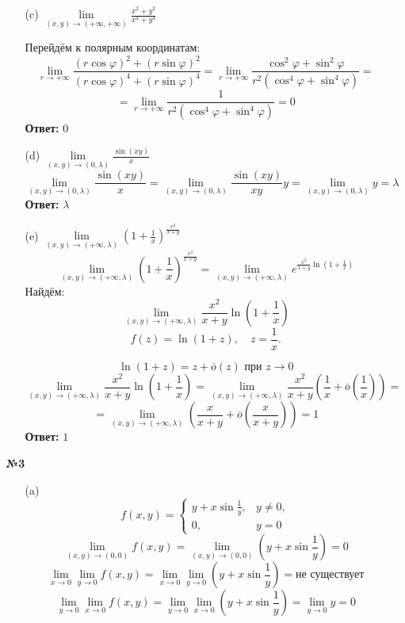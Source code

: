 \documentclass[a4paper]{article}
\newcommand{\lm}[1]{\underset{#1}{\lim}}
\newcommand{\oo}{\overline{o}}
\begin{document}
\begin{enumerate}
\begin{enumerate}
        \item[(c)]$
        \lm{(x, y) \rightarrow(+\infty,+\infty)} \frac{x^{2}+y^{2}}{x^{4}+y^{4}}
        $

        Перейдём к полярным координатам:
        $$\lm{r \to +\infty} \frac{(r\cos\varphi)^{2}+(r\sin\varphi)^{2}}{(r\cos\varphi)^{4}+(r\sin\varphi)^{4}} = \lm{r \to +\infty} \frac{\cos^{2}\varphi+\sin^{2}\varphi}{r^{2}(\cos^{4}\varphi+\sin^{4}\varphi)} = $$
        $$=\lm{r \to +\infty} \frac{1}{r^{2}(\cos^{4}\varphi+\sin^{4}\varphi)} = 0$$
        \textbf{Ответ: } $0$\\

        \item[(d)]$
        \lm{(x, y) \rightarrow(0, \lambda)} \frac{\sin (x y)}{x}
        $
        $$
        \lm{(x, y) \rightarrow(0, \lambda)} \frac{\sin (x y)}{x} = \lm{(x, y) \rightarrow(0, \lambda)} \frac{\sin (x y)}{xy}y = \lm{(x, y) \rightarrow(0, \lambda)} y = \lambda
        $$
        \textbf{Ответ: }$\lambda$

        \item[(e)]$
        \lm{(x, y) \rightarrow(+\infty, \lambda)}\left(1+\frac{1}{x}\right)^{\frac{x^{2}}{x+y}}
        $
        $$
        \lm{(x, y) \rightarrow(+\infty, \lambda)}\left(1+\frac{1}{x}\right)^{\frac{x^{2}}{x+y}} = \lm{(x, y) \rightarrow(+\infty, \lambda)}e^{\frac{x^{2}}{x+y}\ln\left(1+\frac{1}{x}\right)}
        $$
        Найдём:
        $$\lm{(x, y) \rightarrow(+\infty, \lambda)}\frac{x^{2}}{x+y}\ln\left(1+\frac{1}{x}\right)$$
        \[
        f(z) = \ln(1+z), \quad z = \frac{1}{x}.
        \]

        \[
        \ln(1+z) = z + \oo(z) \text{ при $z \to 0$}
        \]
        $$\lm{(x, y) \rightarrow(+\infty, \lambda)}\frac{x^{2}}{x+y}\ln\left(1+\frac{1}{x}\right) = \lm{(x, y) \rightarrow(+\infty, \lambda)}\frac{x^{2}}{x+y}\left(\frac{1}{x} + \oo\left(\frac{1}{x}\right)\right) = $$
        $$=\lm{(x, y) \rightarrow(+\infty, \lambda)}\left(\frac{x}{x+y} + \oo\left(\frac{x}{x+y}\right)\right) = 1$$
        \textbf{Ответ: } $1$\\

    \end{enumerate}

    \item[\textbf{№3}]\begin{enumerate}
        \item[(a)]$$ f(x, y) = \begin{cases} y + x \sin \frac{1}{y}, & y \neq 0, \\ 0, & y = 0 \end{cases} $$
        $$
        \lim_{(x, y) \to (0, 0)} f(x, y) = \lim_{(x, y) \to (0, 0)} \left( y + x \sin \frac{1}{y} \right) =0
        $$
        $$\lim _{x \rightarrow 0} \lim _{y \rightarrow 0} f(x, y) = \lim _{x \rightarrow 0} \lim _{y \rightarrow 0} \left( y + x \sin \frac{1}{y} \right) = \text{не существует}$$
        $$\lim _{y \rightarrow 0} \lim _{x \rightarrow 0} f(x, y) = \lim _{y \rightarrow 0} \lim _{x \rightarrow 0} \left( y + x \sin \frac{1}{y} \right) = \lim _{y \rightarrow 0} y = 0$$\\


\end{enumerate}
\end{enumerate}
\end{document}
